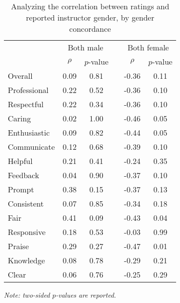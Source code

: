 \documentclass[12pt]{article}
\begin{document}
\begin{table}[htbp]
  \centering
  \footnotesize 
  \caption{Analyzing the correlation between ratings and reported instructor gender, by gender concordance}
    \begin{tabular}{lccccc}
    \toprule 
          & \multicolumn{2}{c}{Both male}  &  & \multicolumn{2}{c}{Both female} \\
                          & $\rho$  &  $p$-value &  & $\rho$  & $p$-value    \\
                          
   \midrule
    Overall &                0.09       & 0.81 & & -0.36    & 0.11   \\
    Professional &           0.22       & 0.52 & & -0.36    & 0.10   \\
    Respectful			   & 0.22       & 0.34 & & -0.36    & 0.10   \\
    Caring &                 0.02       & 1.00 & & -0.46    & 0.05  \\
    Enthusiastic   &         0.09       & 0.82 & & -0.44    & 0.05   \\
    Communicate        &     0.12       & 0.68 & & -0.39    & 0.10  \\
    Helpful   &              0.21       & 0.41 & & -0.24    & 0.35   \\
    Feedback   &             0.04       & 0.90 & & -0.37    & 0.10   \\
    Prompt    &              0.38       & 0.15 & & -0.37    & 0.13   \\
    Consistent   &           0.07       & 0.85 & & -0.34    & 0.18   \\
    Fair   &                 0.41       & 0.09 & & -0.43    & 0.04  \\
    Responsive   &           0.18       & 0.53 & & -0.03    & 0.99  \\
    Praise    &              0.29       & 0.27 & & -0.47    & 0.01  \\
    Knowledge   &            0.08       & 0.78 & & -0.29    & 0.21  \\
    Clear   &                0.06       & 0.76 & & -0.25    & 0.29  \\
    \bottomrule
    \end{tabular}%
 \label{tab:macnell2}%

  \textit{Note: two-sided $p$-values are reported.}
\end{table}%
\normalsize
\end{document}
